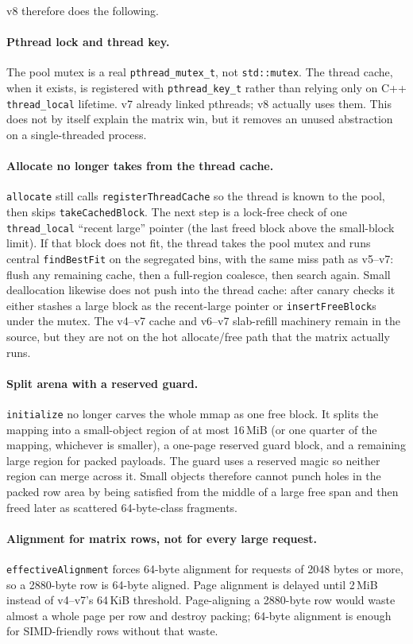 v8 therefore does the following.

\paragraph{Pthread lock and thread key.}
The pool mutex is a real \texttt{pthread\_mutex\_t}, not \texttt{std::mutex}.
The thread cache, when it exists, is registered with \texttt{pthread\_key\_t}
rather than relying only on C++ \texttt{thread\_local} lifetime.
v7 already linked pthreads; v8 actually uses them.
This does not by itself explain the matrix win, but it removes an unused
abstraction on a single-threaded process.

\paragraph{Allocate no longer takes from the thread cache.}
\texttt{allocate} still calls \texttt{registerThreadCache} so the thread is
known to the pool, then skips \texttt{takeCachedBlock}.
The next step is a lock-free check of one \texttt{thread\_local} ``recent
large'' pointer (the last freed block above the small-block limit).
If that block does not fit, the thread takes the pool mutex and runs central
\texttt{findBestFit} on the segregated bins, with the same miss path as v5--v7:
flush any remaining cache, then a full-region coalesce, then search again.
Small deallocation likewise does not push into the thread cache: after canary
checks it either stashes a large block as the recent-large pointer or
\texttt{insertFreeBlock}s under the mutex.
The v4--v7 cache and v6--v7 slab-refill machinery remain in the source, but
they are not on the hot allocate/free path that the matrix actually runs.

\paragraph{Split arena with a reserved guard.}
\texttt{initialize} no longer carves the whole mmap as one free block.
It splits the mapping into a small-object region of at most 16\,MiB
(or one quarter of the mapping, whichever is smaller), a one-page reserved
guard block, and a remaining large region for packed payloads.
The guard uses a reserved magic so neither region can merge across it.
Small objects therefore cannot punch holes in the packed row area by being
satisfied from the middle of a large free span and then freed later as
scattered 64-byte-class fragments.

\paragraph{Alignment for matrix rows, not for every large request.}
\texttt{effectiveAlignment} forces 64-byte alignment for requests of 2048
bytes or more, so a 2880-byte row is 64-byte aligned.
Page alignment is delayed until 2\,MiB instead of v4--v7's 64\,KiB threshold.
Page-aligning a 2880-byte row would waste almost a whole page per row and
destroy packing; 64-byte alignment is enough for SIMD-friendly rows without
that waste.

